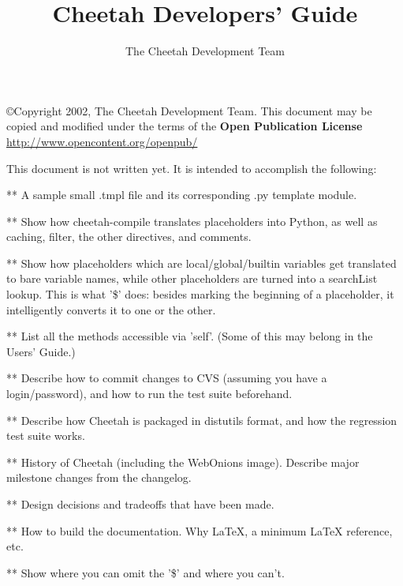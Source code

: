 \documentclass{howto}
\title{Cheetah Developers' Guide}
\author{The Cheetah Development Team}
\begin{document}
\maketitle



\copyright{Copyright 2002, The Cheetah Development Team.
      This document may be copied and modified under the terms of the
      {\bf Open Publication License} \url{http://www.opencontent.org/openpub/} }

This document is not written yet.  It is intended to accomplish the following:

** A sample small .tmpl file and its corresponding .py template module.

** Show how cheetah-compile translates placeholders into Python, as well as
caching, filter, the other directives, and comments.

** Show how placeholders which are local/global/builtin variables get
translated to bare variable names, while other placeholders are turned into a
searchList lookup.  This is what '\$' does: besides marking the beginning of a
placeholder, it intelligently converts it to one or the other.

** List all the methods accessible via 'self'.  (Some of this may belong in the
Users' Guide.)

** Describe how to commit changes to CVS (assuming you have a login/password),
and how to run the test suite beforehand.

** Describe how Cheetah is packaged in distutils format, and how the regression
test suite works.

** History of Cheetah (including the WebOnions image).  Describe major
milestone changes from the changelog.


** Design decisions and tradeoffs that have been made.

** How to build the documentation.  Why LaTeX, a minimum LaTeX reference, etc.

** Show where you can omit the '\$' and where you can't.





\end{document}
